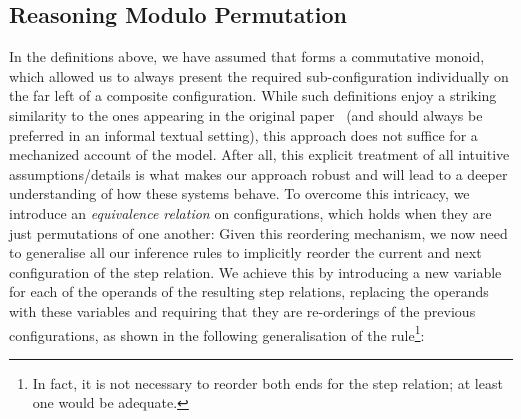 \documentclass[acmsmall,nonacm=true,screen=true]{acmart}
\begin{document}
\subsection{Reasoning Modulo Permutation}
In the definitions above, we have assumed that \inlineMonoid{} forms a commutative monoid, which allowed us
to always present the required sub-configuration individually on the far left of a composite configuration.
While such definitions enjoy a striking similarity to the ones appearing in the original paper~\cite{bitml}
(and should always be preferred in an informal textual setting),
this approach does not suffice for a mechanized account of the model.
After all, this explicit treatment of all intuitive assumptions/details is what makes our approach robust and will lead to
a deeper understanding of how these systems behave. 
To overcome this intricacy, we introduce an \textit{equivalence relation} on configurations, which holds when
they are just permutations of one another:
\BITreordering{}
Given this reordering mechanism, we now need to generalise all our inference rules to implicitly
reorder the current and next configuration of the step relation.
We achieve this by introducing a new variable for each of the operands of the resulting step relations,
replacing the operands with these variables and requiring that they are
re-orderings of the previous configurations, as shown in the following generalisation of the \inlineAuthJoinRule{} rule\footnote{
In fact, it is not necessary to reorder both ends for the step relation; at least one would be adequate.
}:
\BITgeneralRule{}
\end{document}
